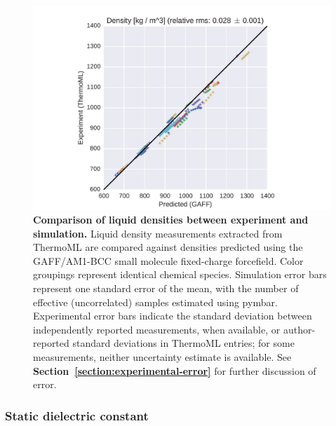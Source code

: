 \documentclass[aps,pre,twocolumn,nofootinbib,superscriptaddress,linenumbers]{revtex4-1}
\begin{document}

\begin{figure}
\includegraphics[width=\columnwidth]{./figures/densities_thermoml.pdf}
\caption{{\bf Comparison of liquid densities between experiment and simulation.}
Liquid density measurements extracted from ThermoML are compared against densities predicted using the GAFF/AM1-BCC small molecule fixed-charge forcefield.
Color groupings represent identical chemical species.  
Simulation error bars represent one standard error of the mean, with the number of effective (uncorrelated) samples estimated using pymbar.  
Experimental error bars indicate the standard deviation between independently reported measurements, when available, or author-reported standard deviations in ThermoML entries; for some measurements, neither uncertainty estimate is available.  
See {\bf Section~\ref{section:experimental-error}} for further discussion of error.
}
\label{figure:Density}
\end{figure}


\subsubsection{Static dielectric constant}
\end{document}
